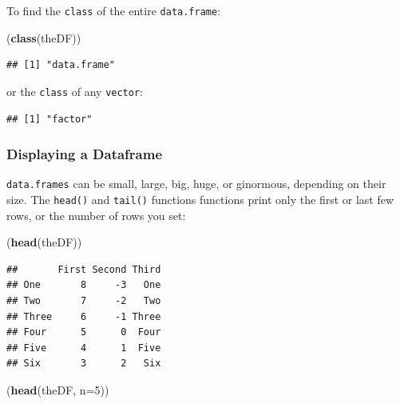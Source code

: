 \documentclass[]{book}
\newenvironment{Shaded}{\begin{snugshade}}{\end{snugshade}}
\newcommand{\DataTypeTok}[1]{\textcolor[rgb]{0.13,0.29,0.53}{#1}}
\newcommand{\DecValTok}[1]{\textcolor[rgb]{0.00,0.00,0.81}{#1}}
\newcommand{\KeywordTok}[1]{\textcolor[rgb]{0.13,0.29,0.53}{\textbf{#1}}}
\newcommand{\NormalTok}[1]{#1}
\newcommand{\OperatorTok}[1]{\textcolor[rgb]{0.81,0.36,0.00}{\textbf{#1}}}
\theoremstyle{definition}
\theoremstyle{definition}
\theoremstyle{definition}
\theoremstyle{remark}
\begin{document}
To find the \texttt{class} of the entire \texttt{data.frame}:

\begin{Shaded}
\begin{Highlighting}[]
\NormalTok{(}\KeywordTok{class}\NormalTok{(theDF))}
\end{Highlighting}
\end{Shaded}

\begin{verbatim}
## [1] "data.frame"
\end{verbatim}

or the \texttt{class} of any \texttt{vector}:

\begin{Shaded}
\end{Shaded}

\begin{verbatim}
## [1] "factor"
\end{verbatim}

\hypertarget{displaying-a-dataframe}{%
\subsubsection{Displaying a Dataframe}\label{displaying-a-dataframe}}

\texttt{data.frames} can be small, large, big, huge, or ginormous,
depending on their size. The \texttt{head()} and \texttt{tail()}
functions functions print only the first or last few rows, or the number
of rows you set:

\begin{Shaded}
\begin{Highlighting}[]
\NormalTok{(}\KeywordTok{head}\NormalTok{(theDF))}
\end{Highlighting}
\end{Shaded}

\begin{verbatim}
##       First Second Third
## One       8     -3   One
## Two       7     -2   Two
## Three     6     -1 Three
## Four      5      0  Four
## Five      4      1  Five
## Six       3      2   Six
\end{verbatim}

\begin{Shaded}
\begin{Highlighting}[]
\NormalTok{(}\KeywordTok{head}\NormalTok{(theDF, }\DataTypeTok{n=}\DecValTok{5}\NormalTok{))}
\end{Highlighting}
\end{Shaded}
\end{document}
